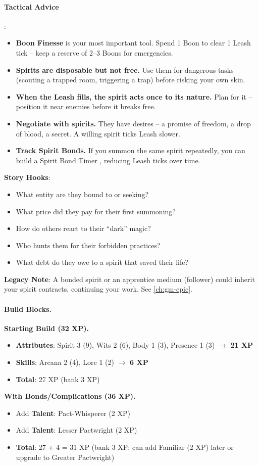 \paragraph{Tactical Advice}:
\begin{itemize}
\item \textbf{Boon Finesse} is your most important tool. Spend 1 Boon to clear 1 Leash tick -- keep a reserve of 2--3 Boons for emergencies.
\item \textbf{Spirits are disposable but not free.} Use them for dangerous tasks (scouting a trapped room, triggering a trap) before risking your own skin.
\item \textbf{When the Leash fills, the spirit acts once to its nature.} Plan for it -- position it near enemies before it breaks free.
\item \textbf{Negotiate with spirits.} They have desires -- a promise of freedom, a drop of blood, a secret. A willing spirit ticks Leash slower.
\item \textbf{Track Spirit Bonds.} If you summon the same spirit repeatedly, you can build a Spirit Bond Timer , reducing Leash ticks over time.
\end{itemize}

\textbf{Story Hooks}:
\begin{itemize}
\item What entity are they bound to or seeking?
\item What price did they pay for their first summoning?
\item How do others react to their ``dark'' magic?
\item Who hunts them for their forbidden practices?
\item What debt do they owe to a spirit that saved their life?
\end{itemize}

\textbf{Legacy Note}: A bonded spirit or an apprentice medium (follower) could inherit your spirit contracts, continuing your work. See \ref{ch:gm-epic}.

\paragraph{Build Blocks.}
\textbf{Starting Build (32 XP).}
\begin{itemize}
\item \textbf{Attributes}: Spirit 3 (9), Wits 2 (6), Body 1 (3), Presence 1 (3) \(\rightarrow\) \textbf{21 XP}
\item \textbf{Skills}: Arcana 2 (4), Lore 1 (2) \(\rightarrow\) \textbf{6 XP}
\item \textbf{Total}: 27 XP (bank 3 XP)
\end{itemize}
\textbf{With Bonds/Complications (36 XP).}
\begin{itemize}
\item Add \textbf{Talent}: Pact-Whisperer (2 XP)
\item Add \textbf{Talent}: Lesser Pactwright (2 XP)
\item \textbf{Total}: 27 + 4 = 31 XP (bank 3 XP; can add Familiar (2 XP) later or upgrade to Greater Pactwright)
\end{itemize}

